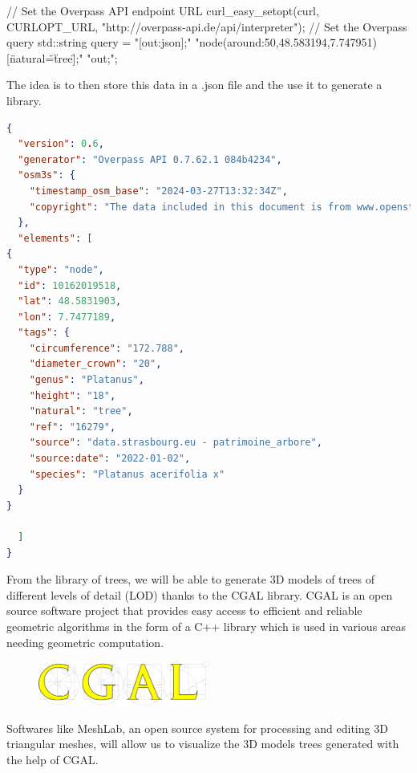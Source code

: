 \documentclass[12pt]{article}
\begin{document}
\vspace{0.5cm}
\begin{cpp}
// Set the Overpass API endpoint URL
curl_easy_setopt(curl, CURLOPT_URL, "http://overpass-api.de/api/interpreter");
// Set the Overpass query
std::string query = "[out:json];"
                    "node(around:50,48.583194,7.747951)[\"natural\"=\"tree\"];"
                    "out;";
\end{cpp}
\vspace{0.5cm}

The idea is to then store this data in a .json file and the use it to generate
a library.

\vspace{0.5cm}
\begin{lstlisting}[language=json]
{
  "version": 0.6,
  "generator": "Overpass API 0.7.62.1 084b4234",
  "osm3s": {
    "timestamp_osm_base": "2024-03-27T13:32:34Z",
    "copyright": "The data included in this document is from www.openstreetmap.org. The data is made available under ODbL."
  },
  "elements": [
{
  "type": "node",
  "id": 10162019518,
  "lat": 48.5831903,
  "lon": 7.7477189,
  "tags": {
    "circumference": "172.788",
    "diameter_crown": "20",
    "genus": "Platanus",
    "height": "18",
    "natural": "tree",
    "ref": "16279",
    "source": "data.strasbourg.eu - patrimoine_arbore",
    "source:date": "2022-01-02",
    "species": "Platanus acerifolia x"
  }
}

  ]
}
\end{lstlisting}
\vspace{0.5cm}

From the library of trees, we will be able to generate 3D models of trees of
different levels of detail (LOD) thanks to the CGAL library.
CGAL is an open source software project that provides easy access to efficient
and reliable geometric algorithms in the form of a C++ library which is used
in various areas needing geometric computation.\cite{cgal}

\begin{figure}[H]
    \vspace{1.5cm}
    \centering
    \includegraphics[width=0.5\textwidth]{images/cgal_logo.png}
\end{figure}

Softwares like MeshLab, an open source system for processing and editing 3D
triangular meshes\cite{meshlab}, will allow us to visualize the 3D models trees generated with
the help of CGAL.
\end{document}
